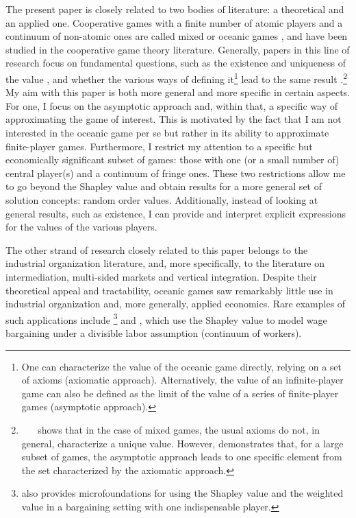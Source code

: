 The present paper is closely related to two bodies of literature: a theoretical and an applied one.
Cooperative games with a finite number of atomic players and a continuum of non-atomic ones are called mixed or oceanic games \parencite{milnor1978values}, and have been studied in the cooperative game theory literature.
Generally, papers in this line of research focus on fundamental questions, such as the existence and uniqueness of the value \parencite{hart1973values}, and whether the various ways of defining it\footnote{
    One can characterize the value of the oceanic game directly, relying on a set of axioms (axiomatic approach). Alternatively, the value of an infinite-player game can also be defined as the limit of the value of a series of finite-player games (asymptotic approach).
} lead to the same result \parencite{fogelman1980asymptotic}.\footnote{
    \textcite{hart1973values} shows that in the case of mixed games, the usual axioms do not, in general, characterize a unique value.
    However, \textcite{fogelman1980asymptotic} demonstrates that, for a large subset of games, the asymptotic approach leads to one specific element from the set characterized by the axiomatic approach. 
}
My aim with this paper is both more general and more specific in certain aspects.
For one, I focus on the asymptotic approach and, within that, a specific way of approximating the game of interest.
This is motivated by the fact that I am not interested in the oceanic game per se but rather in its ability to approximate finite-player games.
Furthermore, I restrict my attention to a specific but economically significant subset of games: those with one (or a small number of) central player(s) and a continuum of fringe ones.
These two restrictions allow me to go beyond the Shapley value and obtain results for a more general set of solution concepts: random order values.
Additionally, instead of looking at general results, such as existence, I can provide and interpret explicit expressions for the values of the various players.

The other strand of research closely related to this paper belongs to the industrial organization literature, and, more specifically, to the literature on intermediation, multi-sided markets and vertical integration.
Despite their theoretical appeal and tractability, oceanic games saw remarkably little use in industrial organization and, more generally, applied economics.
Rare examples of such applications include \textcite{stole1996intra, stole1996organizational}\footnote{
    \textcite{stole1996intra} also provides microfoundations for using the Shapley value and the weighted value in a bargaining setting with one indispensable player.
} and \textcite{levy1997individual}, which use the Shapley value to model wage bargaining under a divisible labor assumption (continuum of workers).

